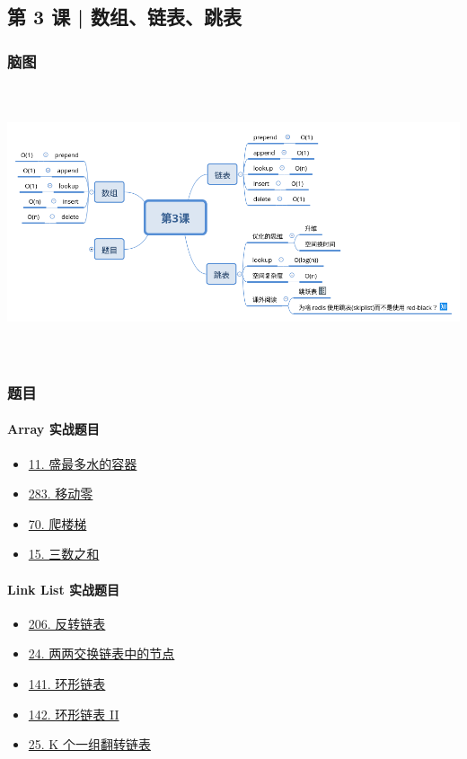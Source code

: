 \subsection{第 3 课 | 数组、链表、跳表}

\subsubsection{脑图}

\includegraphics[width=170mm,height=80mm]{images/第3课.png}

\subsubsection{题目}

\paragraph{Array 实战题目}

\begin{itemize}
  \item \hyperref[leetcode:11]{11. 盛最多水的容器}
  \item \hyperref[leetcode:283]{283. 移动零}
  \item \hyperref[leetcode:70]{70. 爬楼梯}
  \item \hyperref[leetcode:15]{15. 三数之和}
\end{itemize}

\paragraph{Link List 实战题目}

\begin{itemize}
  \item \hyperref[leetcode:206]{206. 反转链表}
  \item \hyperref[leetcode:24]{24. 两两交换链表中的节点}
  \item \hyperref[leetcode:141]{141. 环形链表}
  \item \hyperref[leetcode:142]{142. 环形链表 II}
  \item \hyperref[leetcode:25]{25. K 个一组翻转链表}
\end{itemize}


